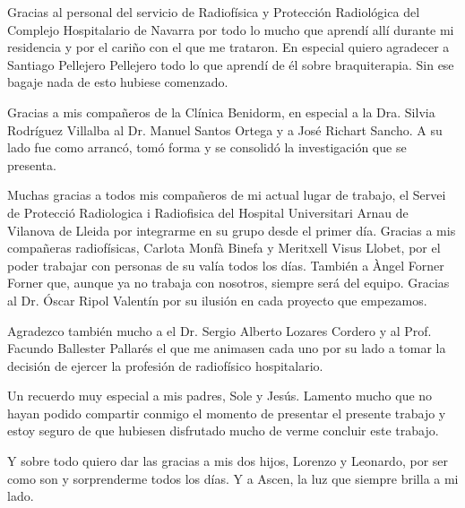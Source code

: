 Gracias al personal del servicio de Radiofísica y Protección Radiológica del Complejo Hospitalario de Navarra por todo lo mucho que aprendí allí durante mi residencia y por el cariño con el que me trataron. En especial quiero agradecer a Santiago Pellejero Pellejero todo lo que aprendí de él sobre braquiterapia. Sin ese bagaje nada de esto hubiese comenzado.

Gracias a mis compañeros de la Clínica Benidorm, en especial a la Dra. Silvia Rodríguez Villalba al Dr. Manuel Santos Ortega y a José Richart Sancho. A su lado fue como arrancó, tomó forma y se consolidó la investigación que se presenta.

Muchas gracias a todos mis compañeros de mi actual lugar de trabajo, el Servei de Protecció Radiologica i Radiofisica del Hospital Universitari Arnau de Vilanova de Lleida por integrarme en su grupo desde el primer día. Gracias a mis compañeras radiofísicas, Carlota Monfà Binefa y Meritxell Visus Llobet, por el poder trabajar con personas de su valía todos los días. También a Àngel Forner Forner que, aunque ya no trabaja con nosotros, siempre será del equipo. Gracias al Dr. Óscar Ripol Valentín por su ilusión en cada proyecto que empezamos.

Agradezco también mucho a el Dr. Sergio Alberto Lozares Cordero y al Prof. Facundo Ballester Pallarés el que me animasen cada uno por su lado a tomar la decisión de ejercer la profesión de radiofísico hospitalario.

Un recuerdo muy especial a mis padres, Sole y Jesús. Lamento mucho que no hayan podido compartir conmigo el momento de presentar el presente trabajo y estoy seguro de que hubiesen disfrutado mucho de verme concluir este trabajo.

Y sobre todo quiero dar las gracias a mis dos hijos, Lorenzo y Leonardo, por ser como son y sorprenderme todos los días. Y a Ascen, la luz que siempre brilla a mi lado.

\newpage
\thispagestyle{empty}
\begin{flushright}
\end{flushright}
